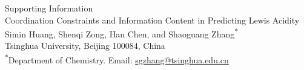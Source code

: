 \documentclass[10pt,a4paper]{article}
\begin{document}
\begin{center}
{\LARGE Supporting Information}\\[8pt]
{\large Coordination Constraints and Information Content in Predicting Lewis Acidity}\\[6pt]
Simin Huang, Shenqi Zong, Han Chen, and Shaoguang Zhang\textsuperscript{*}\\
Tsinghua University, Beijing 100084, China\\
{\small \textsuperscript{*}Department of Chemistry. Email: \href{mailto:sgzhang@tsinghua.edu.cn}{sgzhang@tsinghua.edu.cn}}
\end{center}

\end{document}
